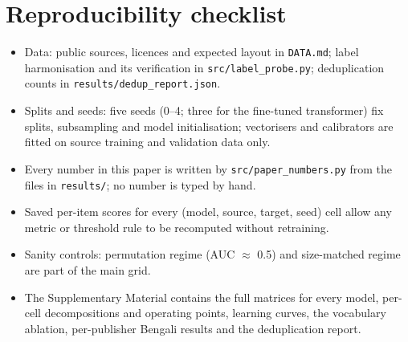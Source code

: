 \section{Reproducibility checklist}\label{app:checklist}
\begin{itemize}
\item Data: public sources, licences and expected layout in \texttt{DATA.md}; label harmonisation and its verification in \texttt{src/label\_probe.py}; deduplication counts in \texttt{results/dedup\_report.json}.
\item Splits and seeds: five seeds (0--4; three for the fine-tuned transformer) fix splits, subsampling and model initialisation; vectorisers and calibrators are fitted on source training and validation data only.
\item Every number in this paper is written by \texttt{src/paper\_numbers.py} from the files in \texttt{results/}; no number is typed by hand.
\item Saved per-item scores for every (model, source, target, seed) cell allow any metric or threshold rule to be recomputed without retraining.
\item Sanity controls: permutation regime (AUC $\approx$ 0.5) and size-matched regime are part of the main grid.
\item The Supplementary Material contains the full matrices for every model, per-cell decompositions and operating points, learning curves, the vocabulary ablation, per-publisher Bengali results and the deduplication report.
\end{itemize}
